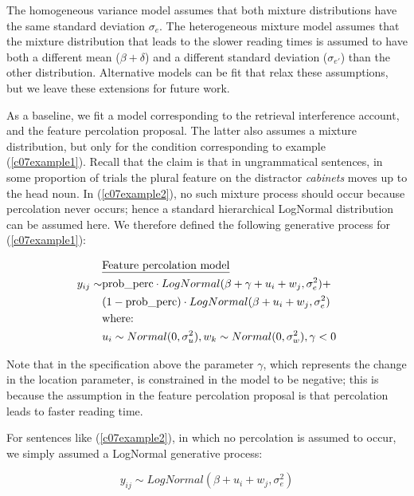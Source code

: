 \documentclass{cambridge7A}\usepackage[]{graphicx}\usepackage[]{color}
\begin{document}
The homogeneous variance model assumes that both mixture distributions have the same standard deviation $\sigma_e$.  The heterogeneous mixture model assumes that the mixture distribution that leads to the slower reading times is assumed to have both a different mean ($\beta+\delta$) and a different standard deviation ($\sigma_{e'}$) than the other distribution.
Alternative models can be fit that relax these assumptions, but we leave these extensions for future work.


As a baseline, we fit a model corresponding to the retrieval interference account,  and the 
feature percolation proposal. The latter also assumes a mixture distribution, but only for the condition corresponding to  example (\ref{c07example1}). Recall that the claim is that in ungrammatical sentences, in some proportion of trials the plural feature on the distractor \textit{cabinets} moves up to the head noun. In (\ref{c07example2}), no such mixture process should occur because percolation never occurs; hence a standard hierarchical LogNormal distribution can be assumed here. We therefore defined the following generative process for (\ref{c07example1}):

\begin{equation}
\begin{split}
       ~&\hbox{\underline{Feature percolation model}}\\
y_{ij} \sim& \hbox{prob\_perc} \cdot LogNormal(\beta+\gamma+u_i+w_j,\sigma_{e}^2)+\\
           ~& (1-\hbox{prob\_perc}) \cdot LogNormal(\beta+u_i+w_j,\sigma_e^2)\\
           ~& \hbox{where: }\\
           ~& u_i \sim Normal(0,\sigma_u^2), w_k \sim Normal(0,\sigma_w^2), \gamma < 0 \\ 
\end{split}
\end{equation}

\noindent
Note that in the specification above the parameter $\gamma$, which represents the change in the location parameter, is constrained in the model to be negative; this is because the assumption in the feature percolation proposal is that percolation leads to faster reading time.

For sentences like (\ref{c07example2}), in which no percolation is assumed to occur, we simply assumed a LogNormal generative process:

\begin{equation}
y_{ij} \sim LogNormal(\beta+u_i+w_j,\sigma_{e}^2)
\end{equation}
\end{document}
